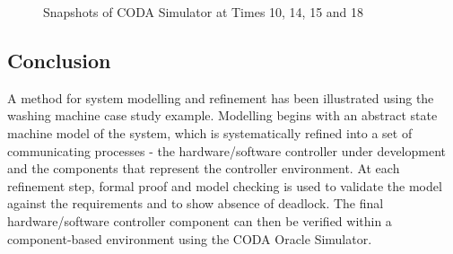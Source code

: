 \begin{figure}[!htbp]
  
  \caption{Snapshots of CODA Simulator at Times 10, 14, 15 and 18}
  \label{fig:SnapshotsOfCODASimulator}
\end{figure} 
 
\subsection{Conclusion}
 
A method for system modelling and refinement has been illustrated using the washing machine case study example. Modelling begins with an abstract state machine model of the system, which is systematically refined into a set of communicating processes - the hardware/software controller under development and the components that represent the controller environment.
At each refinement step, formal proof and model checking is used to validate the model against the requirements and to show absence of deadlock.
The final hardware/software controller component can then be verified within a component-based environment using the CODA Oracle Simulator.

